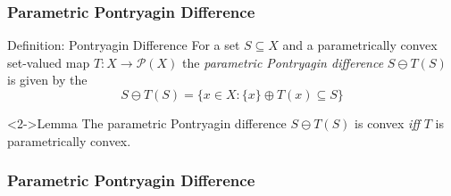 \documentclass{beamer}
\theoremstyle{plain}
\begin{document}
\begin{frame}
\frametitle{Parametric Pontryagin Difference}
\begin{block}{Definition: Pontryagin Difference}
For a set $S\subseteq X$ and a parametrically convex set-valued map $T:X\rightarrow \mathcal P(X)$
the \emph{parametric Pontryagin difference} $S\ominus T(S)$ is given by the 
$$
S\ominus T(S) = \bigl\{x\in X : \{x\}\oplus T(x)\subseteq S \bigr\}
$$
\end{block}

\begin{block}<2->{Lemma}
The parametric Pontryagin difference $S\ominus T(S)$ is convex \emph{iff} $T$ is parametrically convex.
\end{block}
\end{frame}

\begin{frame}
\frametitle{Parametric Pontryagin Difference}







\end{frame}
\end{document}
